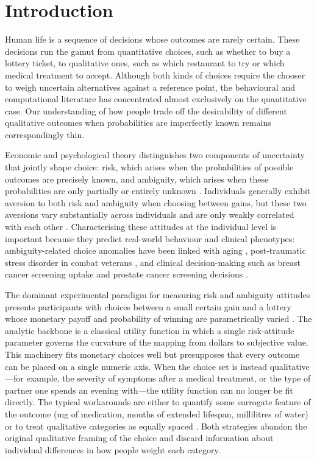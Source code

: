 \section{Introduction}

Human life is a sequence of decisions whose outcomes are rarely certain. These decisions run the gamut from quantitative choices, such as whether to buy a lottery ticket, to qualitative ones, such as which restaurant to try or which medical treatment to accept. Although both kinds of choices require the chooser to weigh uncertain alternatives against a reference point, the behavioural and computational literature has concentrated almost exclusively on the quantitative case. Our understanding of how people trade off the desirability of different qualitative outcomes when probabilities are imperfectly known remains correspondingly thin.

Economic and psychological theory distinguishes two components of uncertainty that jointly shape choice: risk, which arises when the probabilities of possible outcomes are precisely known, and ambiguity, which arises when these probabilities are only partially or entirely unknown \citep{ellsberg1961risk,trimmer2011bayesians}. Individuals generally exhibit aversion to both risk and ambiguity when choosing between gains, but these two aversions vary substantially across individuals and are only weakly correlated with each other \citep{levy2010neural,tymula2013lifespan}. Characterising these attitudes at the individual level is important because they predict real-world behaviour and clinical phenotypes: ambiguity-related choice anomalies have been linked with aging \citep{tymula2013lifespan}, post-traumatic stress disorder in combat veterans \citep{ruderman2016ptsd}, and clinical decision-making such as breast cancer screening uptake \citep{yeh2015dense} and prostate cancer screening decisions \citep{james2017prostate}.

The dominant experimental paradigm for measuring risk and ambiguity attitudes presents participants with choices between a small certain gain and a lottery whose monetary payoff and probability of winning are parametrically varied \citep{levy2010neural,levy2012measuring,jia2020learning}. The analytic backbone is a classical utility function in which a single risk-attitude parameter governs the curvature of the mapping from dollars to subjective value. This machinery fits monetary choices well but presupposes that every outcome can be placed on a single numeric axis. When the choice set is instead qualitative---for example, the severity of symptoms after a medical treatment, or the type of partner one spends an evening with---the utility function can no longer be fit directly. The typical workarounds are either to quantify some surrogate feature of the outcome (mg of medication, months of extended lifespan, millilitres of water) or to treat qualitative categories as equally spaced \citep{bijlenga2007balance,basu2018vio}. Both strategies abandon the original qualitative framing of the choice and discard information about individual differences in how people weight each category.

